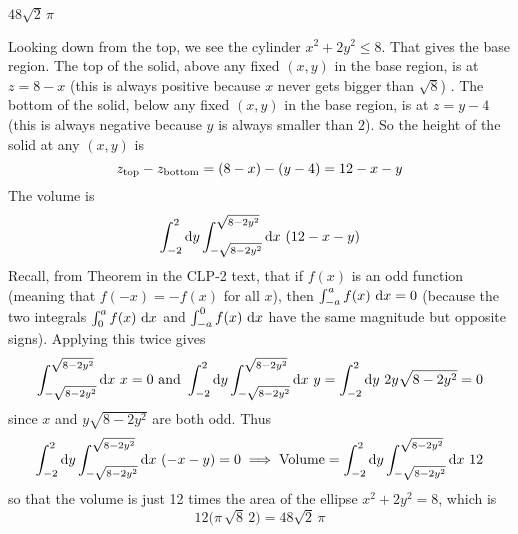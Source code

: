 %

\begin{answer}
$48\sqrt{2}\,\pi$
\end{answer}

\begin{solution}
Looking down from the top, we see the cylinder 
$x^2+2y^2\le 8$. That gives the base region. The top of the solid, above
any fixed $(x,y)$ in the base region, is at $z=8-x$ (this is always positive
because $x$ never gets bigger than $\sqrt{8}$) . The bottom 
of the solid, below any fixed $(x,y)$ in the base region, is at 
$z=y-4$ (this is always negative because $y$ is always smaller than $2$).
So the height of the solid at any $(x,y)$ is 
\begin{equation*}
z_{\rm top}-z_{\rm bottom}
=(8-x)-(y-4)=12-x-y
\end{equation*} 
The volume is
\begin{equation*}
\int_{-2}^{2}\dee{y}\int_{-\sqrt{8-2y^2}}^{\sqrt{8-2y^2}}\dee{x}\ (12-x-y)
\end{equation*}
Recall, from Theorem  in the CLP-2 text, 
that if $f(x)$ is an odd function (meaning that
$f(-x)=-f(x)$ for all $x$), then $\int_{-a}^a f(x)\ \mathrm{d}x=0$ (because the 
two integrals $\int_0^a f(x)\ \dee{x}$ and $\int_{-a}^0 f(x)\ \dee{x}$ have the 
same magnitude but opposite signs). Applying this twice gives
\begin{equation*}
\int_{-\sqrt{8-2y^2}}^{\sqrt{8-2y^2}}\dee{x}\ x=0\text{ and }
\int_{-2}^{2}\dee{y}\int_{-\sqrt{8-2y^2}}^{\sqrt{8-2y^2}}\dee{x}\ y
=\int_{-2}^{2}\dee{y}\ 2y\sqrt{8-2y^2}=0
\end{equation*}
since $x$ and $y\sqrt{8-2y^2}$ are both odd. Thus
\begin{equation*}
\int_{-2}^{2}\dee{y}\int_{-\sqrt{8-2y^2}}^{\sqrt{8-2y^2}}\dee{x}\ (-x-y)=0
\implies 
\text{Volume} = \int_{-2}^{2}\dee{y}\int_{-\sqrt{8-2y^2}}^{\sqrt{8-2y^2}}\dee{x}\ 
12
\end{equation*}
so that the volume is just 12 times the area of the ellipse $x^2+2y^2=8$,
which is
\begin{equation*}
12\big(\pi\,\sqrt{8}\,2\big)= 48\sqrt{2}\,\pi
\end{equation*}
\end{solution}
